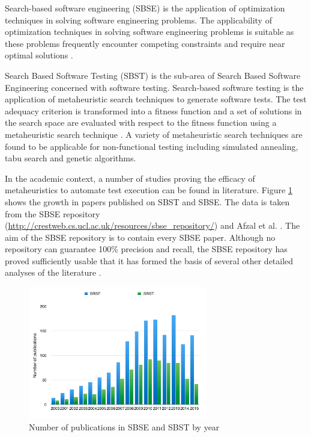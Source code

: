 \documentclass[espaco=umemeio,chapter=TITLE,twoside,openright]{abnt}
\begin{document}
Search-based software engineering (SBSE) is the application of optimization techniques in solving software engineering problems. The applicability of optimization techniques in solving software engineering problems is suitable as these problems frequently encounter competing constraints and require near optimal solutions \cite{Afzal2009a} \cite{Harman2015}.


Search Based Software Testing (SBST) is the sub-area of Search Based Software Engineering concerned with software testing. Search-based software testing is the application of metaheuristic search techniques to generate software tests. The test adequacy criterion is transformed into a fitness function and a set of solutions in the search space are evaluated with respect to the fitness function using a metaheuristic search technique \cite{Afzal2009a} \cite{Aleti2016} \cite{Harman2015}. A variety of metaheuristic search techniques are found to be applicable for non-functional testing including simulated annealing, tabu search and genetic algorithms.

In the academic context, a number of studies proving the efficacy of metaheuristics to automate test execution can be found in literature. Figure \ref{fig:sbsesbst}  shows the growth in papers published on SBST and SBSE. The data is taken from the SBSE repository (\url{http://crestweb.cs.ucl.ac.uk/resources/sbse_repository/}) and Afzal et al. \cite{Afzal2009a} \cite{Harman2015}.
The aim of the SBSE repository is to contain every SBSE paper. Although no repository can guarantee 100\% precision and recall, the SBSE repository has proved sufficiently usable that it has formed the basis of several other detailed analyses of the literature \cite{Harman2015}.


\begin{figure}[h]
\centering
\includegraphics[width=0.7\textwidth]{./images/publications1.png}
\caption{Number of publications in SBSE and SBST by year \cite{Afzal2009a} \cite{Harman2015}}
\label{fig:sbsesbst}
\end{figure}
\end{document}
